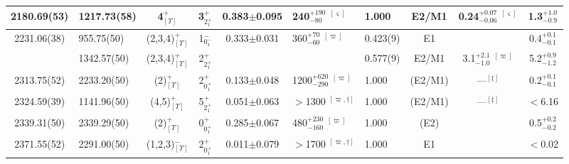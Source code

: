 \begin{landscape}
\begin{center}
\begin{longtable}{clcccllccc}
 2180.69(53)&  1217.73(58)               & 4$^+_{[\Upsilon]}$ & 3$^+_{2^+_1}$ &0.383$\pm$0.095& 240$^{+190}_{-80}$ $^{[\varsigma]}$             &1.000                & E2/M1 & 0.24$^{+0.07}_{-0.06}$ $^{[\varsigma]}$      & 1.3$^{+1.0}_{-0.9}$        \\ \hline
 2231.06(38)&  955.75(50) & (2,3,4)$^+_{[\Upsilon]}$     & 1$^-_{0^-_1}$ &0.333$\pm$0.031& 360$^{+70}_{-60}$       $^{[\varpi]}$           &0.423(9)             & E1    &                                          & 0.4$^{+0.1}_{-0.1}$\\
            & 1342.57(50) & (2,3,4)$^+_{[\Upsilon]}$     & 2$^+_{2^+_1}$ &&                                                                 &0.577(9)             & E2/M1 & 3.1$^{+2.1}_{-1.0}$ $^{[\varpi]}$       & 5.2$^{+0.9}_{-1.2}$\\ \hline 
 2313.75(52)& 2233.20(50) & (2)$^+_{[\Upsilon]}$     & 2$^+_{0^+_1}$ &0.133$\pm$0.048& 1200$^{+620}_{-290}$    $^{[\varpi]}$               &1.000                &(E2/M1)& ---$^{[\ddagger]}$                       & 0.2$^{+0.1}_{-0.1}$  \\ \hline
 2324.59(39)& 1141.96(50) & (4,5)$^+_{[\Upsilon]}$   & 5$^+_{2^+_1}$ &0.051$\pm$0.063& $>$1300 $^{[\varpi,\dagger]}$                       &1.000                &(E2/M1)& ---$^{[\ddagger]}$                       & $<$6.16             \\ \hline
 2339.31(50)& 2339.29(50) & (2)$^+_{[\Upsilon]}$     & 0$^+_{0^+_1}$ &0.285$\pm$0.067& 480$^{+230}_{-160}$     $^{[\varpi]}$               &1.000                & (E2)  &                                          & 0.5$^{+0.2}_{-0.2}$     \\ \hline
 2371.55(52)& 2291.00(50) & (1,2,3)$^-_{[\Upsilon]}$ & 2$^+_{0^+_1}$ &0.011$\pm$0.079& $>$1700 $^{[\varpi,\dagger]}$                       &1.000                & E1    &                                          & $<$0.02                             \\ \hline

\end{longtable}
\end{center}
\end{landscape}
